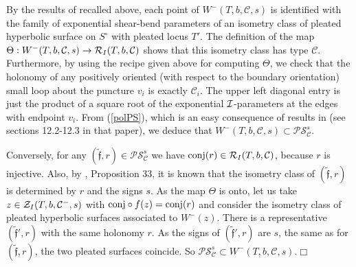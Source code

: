  By the results of \cite{Bo} recalled above,
each point of $W^-(T,b,\mathcal{C},s)$ is identified with the
family of exponential shear-bend parameters of an isometry class
of pleated hyperbolic surface on $S^{\circ}$ with pleated locus
$T'$. The definition of the map $\Theta: W^-(T,b,\mathcal{C},s)
\rightarrow {\mathcal R}_I(T,b,\mathcal{C})$ shows that this isometry class
has type $\mathcal{C}$. Furthermore, by using the recipe given
above for computing $\Theta$, we check that the holonomy of any
positively oriented (with respect to the boundary orientation)
small loop about the puncture $v_i$ is exactly $\mathcal{C}_i$.
The upper left diagonal entry is just the product of a square root
of the exponential ${\mathcal I}$-parameters at the edges with endpoint
$v_i$. From (\ref{polPS}), which is an easy consequence of results
in \cite{Bo} (see sections 12.2-12.3 in that paper), we deduce
that $W^-(T,b,\mathcal{C},s) \subset
\mathcal{P}\mathcal{S}_{\mathcal{C}}^s$.

Conversely, for any $(\tilde{\mathfrak{f}},r) \in
\mathcal{P}\mathcal{S}_{\mathcal{C}}^s$ we have $ {\rm conj}(r) \in
{\mathcal R}_I(T,b,\mathcal{C})$, because $r$ is injective. Also, by
\cite{BoL}, Proposition 33, it is known that the isometry class of
$(\tilde{\mathfrak{f}},r)$ is determined by $r$ and the signs $s$.
As the map $\Theta$ is onto, let us take $z \in
{\mathcal Z}_I(T,b,\mathcal{C}^-,s)$ with ${\rm conj} \circ f(z) = {\rm conj}(r)$
and consider the isometry class of pleated hyperbolic surfaces
associated to $W^-(z)$. There is a representative
$(\tilde{\mathfrak{f}}',r)$ with the same holonomy $r$. As the signs
of $(\tilde{\mathfrak{f}}',r)$ are $s$, the same as for
$(\tilde{\mathfrak{f}},r)$, the two pleated surfaces coincide. So
$\mathcal{P}\mathcal{S}_{\mathcal{C}}^s \subset
W^-(T,b,\mathcal{C},s)$.\hfill$\Box$

